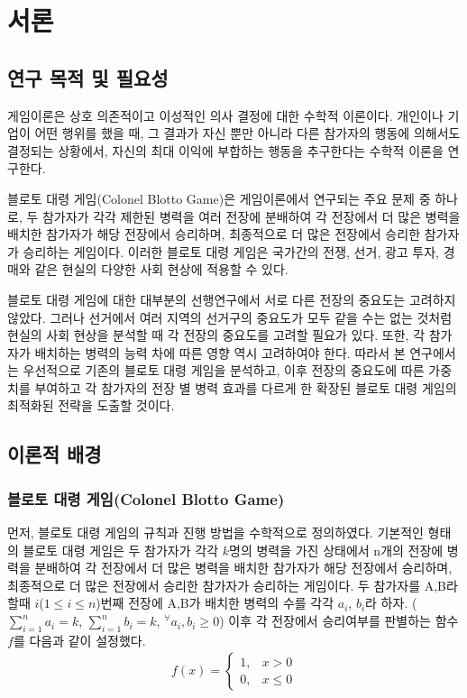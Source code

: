 \section{서론}
\subsection{연구 목적 및 필요성}
게임이론은 상호 의존적이고 이성적인 의사 결정에 대한 수학적 이론이다. 개인이나 기업이 어떤 행위를 했을 때, 그 결과가 자신 뿐만 아니라 다른 참가자의 행동에 의해서도 결정되는 상황에서, 자신의 최대 이익에 부합하는 행동을 추구한다는 수학적 이론을 연구한다.

블로토 대령 게임(Colonel Blotto Game)은 게임이론에서 연구되는 주요 문제 중 하나로, 두 참가자가 각각 제한된 병력을 여러 전장에 분배하여 각 전장에서 더 많은 병력을 배치한 참가자가 해당 전장에서 승리하며, 최종적으로 더 많은 전장에서 승리한 참가자가 승리하는 게임이다. 이러한 블로토 대령 게임은 국가간의 전쟁, 선거, 광고 투자, 경매와 같은 현실의 다양한 사회 현상에 적용할 수 있다. \cite{behnezhad2018battlefields}

블로토 대령 게임에 대한 대부분의 선행연구에서 서로 다른 전장의 중요도는 고려하지 않았다. 그러나 선거에서 여러 지역의 선거구의 중요도가 모두 같을 수는 없는 것처럼 현실의 사회 현상을 분석할 때 각 전장의 중요도를 고려할 필요가 있다. 또한, 각 참가자가 배치하는 병력의 능력 차에 따른 영향 역시 고려하여야 한다. 따라서 본 연구에서는 우선적으로 기존의 블로토 대령 게임을 분석하고, 이후 전장의 중요도에 따른 가중치를 부여하고 각 참가자의 전장 별 병력 효과를 다르게 한 확장된 블로토 대령 게임의 최적화된 전략을 도출할 것이다.

\subsection{이론적 배경}
\subsubsection{블로토 대령 게임(Colonel Blotto Game)}
먼저, 블로토 대령 게임의 규칙과 진행 방법을 수학적으로 정의하였다. 기본적인 형태의 블로토 대령 게임은 두 참가자가 각각 $k$명의 병력을 가진 상태에서 n개의 전장에 병력을 분배하여 각 전장에서 더 많은 병력을 배치한 참가자가 해당 전장에서 승리하며, 최종적으로 더 많은 전장에서 승리한 참가자가 승리하는 게임이다. 두 참가자를 A,B라 할때 $i$($1\le i\le n$)번째 전장에 A,B가 배치한 병력의 수를 각각 $a_i$, $b_i$라 하자. ($\sum\limits_{i=1}^n a_i=k$, $\sum\limits_{i=1}^n b_i=k$, ${}_{}^{\forall}a_i, b_i \ge 0$)
이후 각 전장에서 승리여부를 판별하는 함수 $f$를 다음과 같이 설정했다.
\begin{align}
    f(x)=\begin{cases}
    1, & x>0 \\
    0, & x\le 0
\end{cases}
\end{align}

